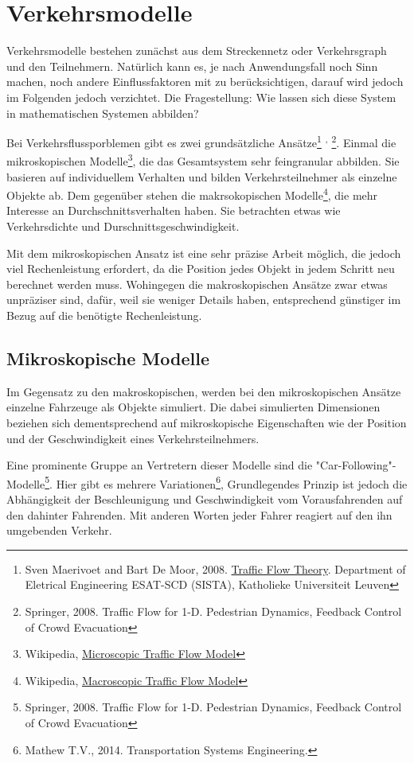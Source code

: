 \section{Verkehrsmodelle}

Verkehrsmodelle bestehen zunächst aus dem Streckennetz oder Verkehrsgraph und den Teilnehmern. Natürlich kann es, je nach Anwendungsfall noch Sinn machen, noch andere Einflussfaktoren mit zu berücksichtigen, darauf wird jedoch im Folgenden jedoch verzichtet. Die Fragestellung: Wie lassen sich diese System in mathematischen Systemen abbilden?

Bei Verkehrsflussporblemen gibt es zwei grundsätzliche Ansätze\footnote{Sven Maerivoet and Bart De Moor, 2008. \href{ftp://ftp.esat.kuleuven.be/sista/smaerivo/reports/paper-05-154.pdf}{Traffic Flow Theory}. Department of Eletrical Engineering ESAT-SCD (SISTA), Katholieke Universiteit Leuven}
\textsuperscript{,}
\footnote{Springer, 2008. Traffic Flow for 1-D. Pedestrian Dynamics, Feedback Control of Crowd Evacuation}. Einmal die mikroskopischen Modelle\footnote{Wikipedia, \href{https://en.wikipedia.org/wiki/Microscopic\_traffic\_flow\_model}{Microscopic Traffic Flow Model}}, die das Gesamtsystem sehr feingranular abbilden. Sie basieren auf individuellem Verhalten und bilden Verkehrsteilnehmer als einzelne Objekte ab.
Dem gegenüber stehen die makrsokopischen Modelle\footnote{Wikipedia, \href{https://en.wikipedia.org/wiki/Macroscopic\_traffic\_flow\_model}{Macroscopic Traffic Flow Model}}, die mehr Interesse an Durchschnittsverhalten haben. Sie betrachten etwas wie Verkehrsdichte und Durschnittsgeschwindigkeit.

Mit dem mikroskopischen Ansatz ist eine sehr präzise Arbeit möglich, die jedoch viel Rechenleistung erfordert, da die Position jedes Objekt in jedem Schritt neu berechnet werden muss. Wohingegen die makroskopischen Ansätze zwar etwas unpräziser sind, dafür, weil sie weniger Details haben, entsprechend günstiger im Bezug auf die benötigte Rechenleistung.


\subsection{Mikroskopische Modelle}
Im Gegensatz zu den makroskopischen, werden bei den mikroskopischen Ansätze einzelne Fahrzeuge als Objekte simuliert. Die dabei simulierten Dimensionen beziehen sich dementsprechend auf mikroskopische Eigenschaften wie der Position und der Geschwindigkeit eines Verkehrsteilnehmers.

Eine prominente Gruppe an Vertretern dieser Modelle sind die "Car-Following"-Modelle\footnote{Springer, 2008. Traffic Flow for 1-D. Pedestrian Dynamics, Feedback Control of Crowd Evacuation}. Hier gibt es mehrere Variationen\footnote{Mathew T.V., 2014. Transportation Systems Engineering.}, Grundlegendes Prinzip ist jedoch die Abhängigkeit der Beschleunigung und Geschwindigkeit vom Vorausfahrenden auf den dahinter Fahrenden. Mit anderen Worten jeder Fahrer reagiert auf den ihn umgebenden Verkehr.

